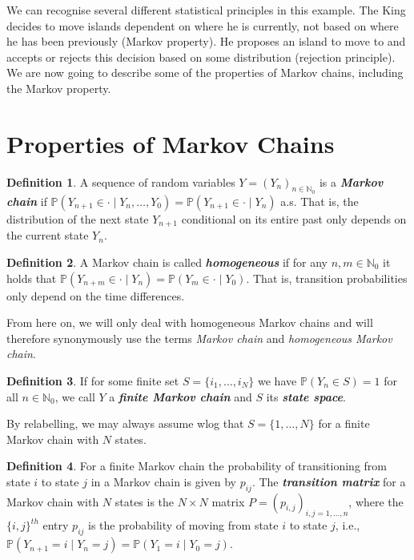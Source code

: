 \documentclass[
]{book}
\theoremstyle{definition}
\newtheorem{definition}{Definition}[chapter]
\theoremstyle{definition}
\theoremstyle{definition}
\theoremstyle{definition}
\theoremstyle{remark}
\begin{document}
We can recognise several different statistical principles in this example. The King decides to move islands dependent on where he is currently, not based on where he has been previously (Markov property). He proposes an island to move to and accepts or rejects this decision based on some distribution (rejection principle). We are now going to describe some of the properties of Markov chains, including the Markov property.

\hypertarget{properties-of-markov-chains}{%
\section{Properties of Markov Chains}\label{properties-of-markov-chains}}

\begin{definition}
\protect\hypertarget{def:Markov}{}\label{def:Markov}A sequence of random variables \(Y = (Y_n)_{n \in \mathbb{N}_0}\) is a \textbf{\emph{Markov chain}} if \(\mathbb{P}(Y_{n+1} \in \cdot \mid Y_{n}, \ldots, Y_0) = \mathbb{P}(Y_{n+1} \in \cdot \mid Y_{n})\) a.s. That is, the distribution of the next state \(Y_{n+1}\) conditional on its entire past only depends on the current state \(Y_n\).
\end{definition}

\begin{definition}
A Markov chain is called \textbf{\emph{homogeneous}} if for any \(n,m \in \mathbb{N}_0\) it holds that \(\mathbb{P}(Y_{n+ m} \in \cdot \mid Y_n) = \mathbb{P}(Y_{m} \in \cdot \mid Y_0)\). That is, transition probabilities only depend on the time differences.
\end{definition}

From here on, we will only deal with homogeneous Markov chains and will therefore synonymously use the terms \emph{Markov chain} and \emph{homogeneous Markov chain}.

\begin{definition}
If for some finite set \(S = \{i_1,\ldots,i_N\}\) we have \(\mathbb{P}(Y_n \in S) = 1\) for all \(n \in \mathbb{N}_0\), we call \(Y\) a \textbf{\emph{finite Markov chain}} and \(S\) its \textbf{\emph{state space}}.
\end{definition}

By relabelling, we may always assume wlog that \(S = \{1,\ldots,N\}\) for a finite Markov chain with \(N\) states.

\begin{definition}
For a finite Markov chain the probability of transitioning from state \(i\) to state \(j\) in a Markov chain is given by \(p_{ij}\). The \textbf{\emph{transition matrix}} for a Markov chain with \(N\) states is the \(N \times N\) matrix \(P = (p_{i,j})_{i,j=1,\ldots,n}\), where the \(\{i, j\}^{th}\) entry \(p_{ij}\) is the probability of moving from state \(i\) to state \(j\), i.e., \(\mathbb{P}(Y_{n+1} = i \mid Y_n = j) = \mathbb{P}(Y_{1} = i \mid Y_0 = j).\)
\end{definition}
\end{document}
